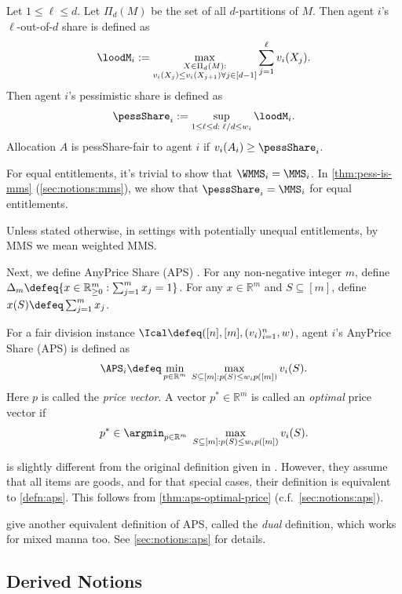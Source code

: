 \begin{definition}
\label{defn:pessShare}
Let $1 \le \ell \le d$. Let $\Pi_d(M)$ be the set of all $d$-partitions of $M$.
Then agent $i$'s $\ell$-out-of-$d$ share is defined as
\[ \loodM_i := \max_{\substack{X \in \Pi_d(M):\\v_i(X_j) \le v_i(X_{j+1}) \forall j \in [d-1]}} \sum_{j=1}^{\ell} v_i(X_j). \]
Then agent $i$'s pessimistic share is defined as
\[ \pessShare_i := \sup_{1 \le \ell \le d:\;\ell / d \le w_i} \loodM_i. \]
Allocation $A$ is pessShare-fair to agent $i$ if $v_i(A_i) \ge \pessShare_i$.
\end{definition}

For equal entitlements, it's trivial to show that $\WMMS_i = \MMS_i$.
In \cref{thm:pess-is-mms} (\cref{sec:notions:mms}),
we show that $\pessShare_i = \MMS_i$ for equal entitlements.

Unless stated otherwise, in settings with potentially unequal entitlements,
by MMS we mean weighted MMS.

Next, we define AnyPrice Share (APS) \cite{babaioff2023fair}.
For any non-negative integer $m$, define
$\Delta_m \defeq \{x \in \mathbb{R}^m_{\ge 0}: \sum_{j=1}^m x_j = 1\}$.
For any $x \in \mathbb{R}^m$ and $S \subseteq [m]$, define $x(S) \defeq \sum_{j=1}^m x_j$.

\begin{definition}[APS]
\label{defn:aps}
For a fair division instance $\Ical \defeq ([n], [m], (v_i)_{i=1}^n, w)$,
agent $i$'s AnyPrice Share (APS) is defined as
\[ \APS_i \defeq \min_{p \in \mathbb{R}^m}\;\max_{S \subseteq [m]: p(S) \le w_ip([m])} v_i(S). \]
Here $p$ is called the \emph{price vector}.
A vector $p^* \in \mathbb{R}^m$ is called an \emph{optimal} price vector if
\[ p^* \in \argmin_{p \in \mathbb{R}^m}\;\max_{S \subseteq [m]: p(S) \le w_ip([m])} v_i(S). \]
\end{definition}

 is slightly different from the original definition given in \cite{babaioff2023fair}.
However, they assume that all items are goods, and for that special cases,
their definition is equivalent to \cref{defn:aps}.
This follows from \cref{thm:aps-optimal-price} (c.f.~\cref{sec:notions:aps}).

\cite{babaioff2023fair} give another equivalent definition of APS,
called the \emph{dual} definition, which works for mixed manna too.
See \cref{sec:notions:aps} for details.

\subsection{Derived Notions}

